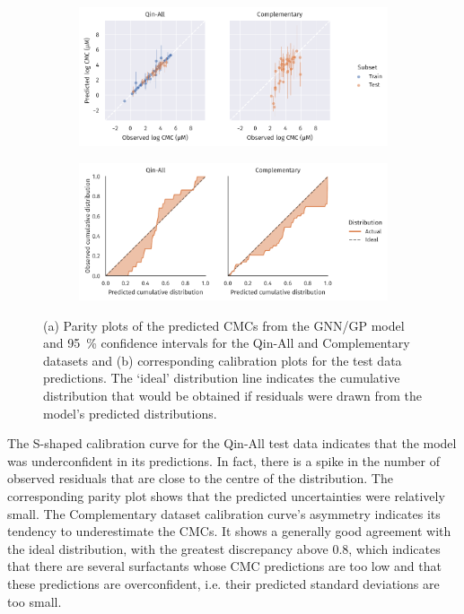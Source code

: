 \begin{figure}
    \centering
    \begin{subfigure}{\textwidth}
        \includegraphics[width=\textwidth]{images/uq-parity.pdf}
        \caption{}
        \label{fig:uq-parity}
    \end{subfigure}
    \begin{subfigure}{\textwidth}
        \includegraphics[width=\textwidth]{images/uq-calibration.pdf}
        \caption{}
        \label{fig:uq-calibration}
    \end{subfigure}
    \caption{(a) Parity plots of the predicted CMCs from the GNN/GP model and \SI{95}{\%}
        confidence intervals for the Qin-All and Complementary datasets and (b)
        corresponding calibration plots for the test data predictions. The
        `ideal' distribution line indicates the cumulative distribution that
        would be obtained if residuals were drawn from the model's predicted
        distributions.}
\end{figure}

The S-shaped calibration curve for the Qin-All test data indicates that the
model was underconfident in its predictions. In fact, there is a spike in the
number of observed residuals that are close to the centre of the distribution.
The corresponding parity plot shows that the predicted uncertainties were
relatively small. The Complementary dataset calibration curve's asymmetry indicates its
tendency to underestimate the CMCs. It shows a generally good agreement with the
ideal distribution, with the greatest discrepancy above \num{0.8}, which
indicates that there are several surfactants whose CMC predictions are too low
and that these predictions are overconfident, i.e. their predicted standard
deviations are too small.

